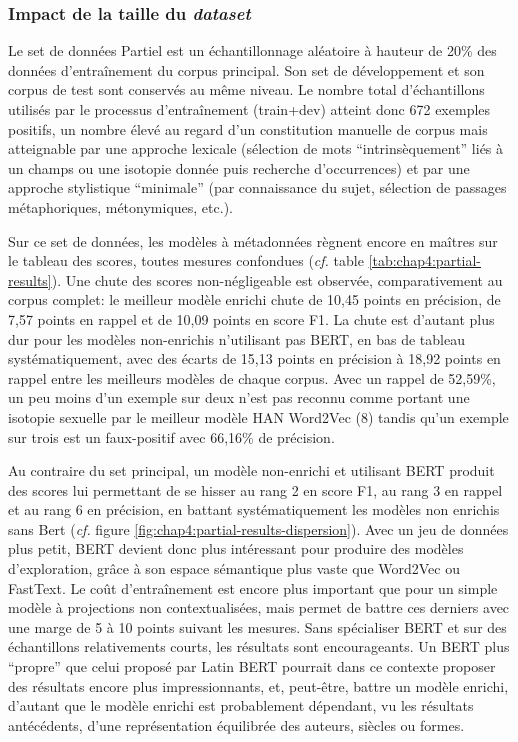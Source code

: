 \subsubsection{Impact de la taille du \textit{dataset}}

Le set de données Partiel est un échantillonnage aléatoire à hauteur de 20\% des données d'entraînement du corpus principal. Son set de développement et son corpus de test sont conservés au même niveau. Le nombre total d'échantillons utilisés par le processus d'entraînement (train+dev) atteint donc 672 exemples positifs, un nombre élevé au regard d'un constitution manuelle de corpus mais atteignable par une approche lexicale (sélection de mots ``intrinsèquement'' liés à un champs ou une isotopie donnée puis recherche d'occurrences) et par une approche stylistique ``minimale'' (par connaissance du sujet, sélection de passages métaphoriques, métonymiques, etc.).

Sur ce set de données, les modèles à métadonnées règnent encore en maîtres sur le tableau des scores, toutes mesures confondues (\textit{cf.} table \ref{tab:chap4:partial-results}). Une chute des scores non-négligeable est observée, comparativement au corpus complet: le meilleur modèle enrichi chute de 10,45 points en précision, de 7,57 points en rappel et de 10,09 points en score F1. La chute est d'autant plus dur pour les modèles non-enrichis n'utilisant pas BERT, en bas de tableau systématiquement, avec des écarts de 15,13 points en précision à 18,92 points en rappel entre les meilleurs modèles de chaque corpus. Avec un rappel de 52,59\%, un peu moins d'un exemple sur deux n'est pas reconnu comme portant une isotopie sexuelle par le meilleur modèle HAN Word2Vec (8) tandis qu'un exemple sur trois est un faux-positif avec 66,16\% de précision.

Au contraire du set principal, un modèle non-enrichi et utilisant BERT produit des scores lui permettant de se hisser au rang 2 en score F1, au rang 3 en rappel et au rang 6 en précision, en battant systématiquement les modèles non enrichis sans Bert (\textit{cf.} figure \ref{fig:chap4:partial-results-dispersion}). Avec un jeu de données plus petit, BERT devient donc plus intéressant pour produire des modèles d'exploration, grâce à son espace sémantique plus vaste que Word2Vec ou FastText. Le coût d'entraînement est encore plus important que pour un simple modèle à projections non contextualisées, mais permet de battre ces derniers avec une marge de 5 à 10 points suivant les mesures. Sans spécialiser BERT et sur des échantillons relativements courts, les résultats sont encourageants. Un BERT plus ``propre'' que celui proposé par Latin BERT pourrait dans ce contexte proposer des résultats encore plus impressionnants, et, peut-être, battre un modèle enrichi, d'autant que le modèle enrichi est probablement dépendant, vu les résultats antécédents, d'une représentation équilibrée des auteurs, siècles ou formes.


